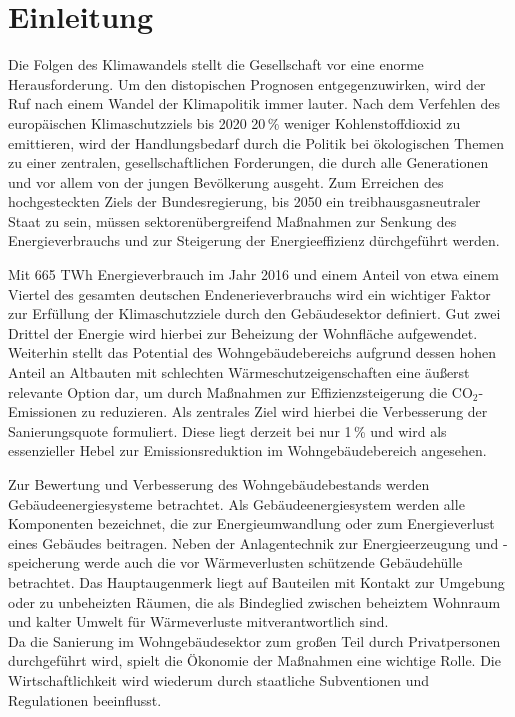 \chapter{Einleitung}

Die Folgen des Klimawandels stellt die Gesellschaft vor eine enorme Herausforderung.
Um den distopischen Prognosen entgegenzuwirken, wird der Ruf nach einem Wandel der Klimapolitik immer lauter.
Nach dem Verfehlen des europäischen Klimaschutzziels bis 2020 20\,\% weniger Kohlenstoffdioxid zu emittieren, wird der Handlungsbedarf durch die Politik bei ökologischen Themen zu einer zentralen, gesellschaftlichen Forderungen, die durch alle Generationen und vor allem von der jungen Bevölkerung ausgeht. %
Zum Erreichen des hochgesteckten Ziels der Bundesregierung, bis 2050 ein treibhausgasneutraler Staat zu sein, müssen sektorenübergreifend Maßnahmen zur Senkung des Energieverbrauchs und zur Steigerung der Energieeffizienz dürchgeführt werden. %

Mit 665 TWh Energieverbrauch im Jahr 2016 und einem Anteil von etwa einem Viertel des gesamten deutschen Endenerieverbrauchs wird ein wichtiger Faktor zur Erfüllung der Klimaschutzziele durch den Gebäudesektor definiert.
Gut zwei Drittel der Energie wird hierbei zur Beheizung der Wohnfläche aufgewendet.
Weiterhin stellt das Potential des Wohngebäudebereichs aufgrund dessen hohen Anteil an Altbauten mit schlechten Wärmeschutzeigenschaften eine äußerst relevante Option dar, um durch Maßnahmen zur Effizienzsteigerung die CO\(_2\)-Emissionen zu reduzieren.
Als zentrales Ziel wird hierbei die Verbesserung der Sanierungsquote formuliert. 
Diese liegt derzeit bei nur 1\,\% und wird als essenzieller Hebel zur Emissionsreduktion im Wohngebäudebereich angesehen.

Zur Bewertung und Verbesserung des Wohngebäudebestands werden Gebäudeenergiesysteme betrachtet.
Als Gebäudeenergiesystem werden alle Komponenten bezeichnet, die zur Energieumwandlung oder zum Energieverlust eines Gebäudes beitragen.
Neben der Anlagentechnik zur Energieerzeugung und -speicherung werde auch die vor Wärmeverlusten schützende Gebäudehülle betrachtet.
Das Hauptaugenmerk liegt auf Bauteilen mit Kontakt zur Umgebung oder zu unbeheizten Räumen, die als Bindeglied zwischen beheiztem Wohnraum und kalter Umwelt für Wärmeverluste mitverantwortlich sind. \\
Da die Sanierung im Wohngebäudesektor zum großen Teil durch Privatpersonen durchgeführt wird, spielt die Ökonomie der Maßnahmen eine wichtige Rolle.
Die Wirtschaftlichkeit wird wiederum durch staatliche Subventionen und Regulationen beeinflusst.


